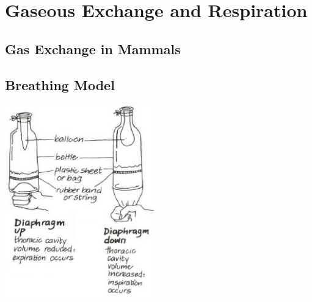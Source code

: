 \section{Gaseous Exchange and Respiration} 

\begin{multicols}{2}


\section*{Gas Exchange in Mammals}  


\subsection{Breathing Model} %

\begin{center}
\includegraphics[width=0.49\textwidth]{./img/vso/breathing-model.jpg}
\end{center}


\end{multicols}
